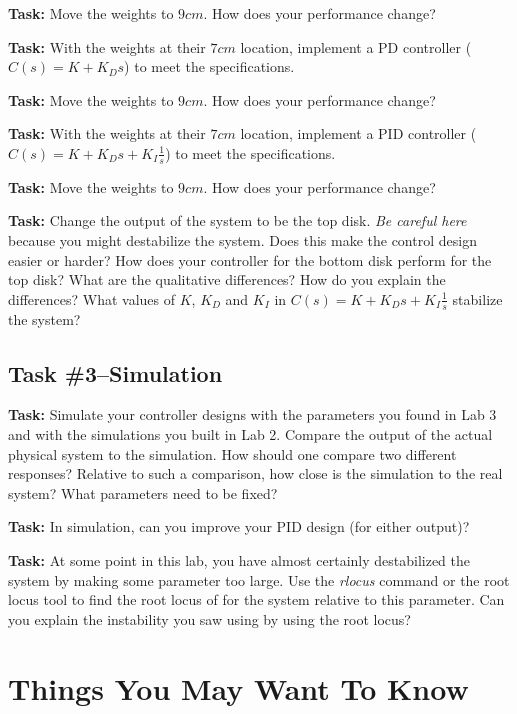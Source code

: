 \noindent \textbf{Task:}  Move the weights to  $9 cm$.  How does your
performance change?

\noindent \textbf{Task:}  With the weights at their $7 cm$ location, implement a
PD  controller ($C(s)=K+K_D s$) to meet the specifications.

\noindent \textbf{Task:}  Move the weights to  $9 cm$.  How does your
performance change?


\noindent \textbf{Task:}  With the weights at their $7 cm$ location, implement 
a PID controller ($C(s)=K+K_D s+ K_I \frac{1}{s}$) to meet the specifications.

\noindent \textbf{Task:}  Move the weights to  $9 cm$.  How does your
performance change?

\noindent \textbf{Task:}  Change the output of the system to be the top disk.
\emph{Be careful here} because you might destabilize the system.  Does this make
the control design easier or harder?  How does your controller for the bottom
disk perform for the top disk?  What are the qualitative differences?  How do
you explain the differences?  What values of $K$, $K_D$ and $K_I$ in $C(s)=K+K_D
s+ K_I \frac{1}{s}$ stabilize the system?



\subsection{Task \#3--Simulation}

\noindent \textbf{Task:}  Simulate your controller designs with the parameters
you found in Lab 3 and with the simulations you built in Lab 2.  Compare the
output of the actual physical system to the simulation.  How should one compare
two different responses? Relative to such a comparison, how close is the
simulation to the real system?  What parameters need to be fixed?


\noindent \textbf{Task:}  In simulation, can you improve your PID design (for
either output)?  

\noindent \textbf{Task:}  At some point in this lab, you have almost certainly
destabilized the system by making some parameter too large.  Use the
\emph{rlocus} command or the root locus tool to find the root locus of for the
system relative to this parameter.  Can you explain the instability you saw
using by using the root locus?





\section{Things You May Want To Know}

